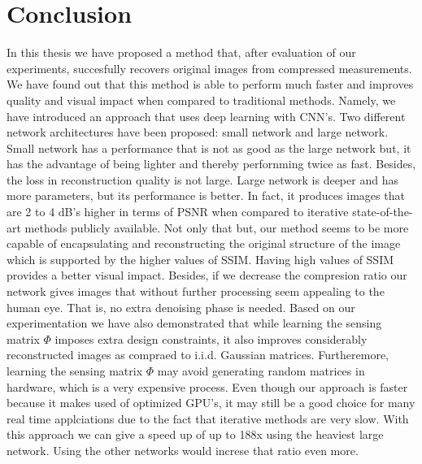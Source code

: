 \chapter{Conclusion}
In this thesis we have proposed a method that, after evaluation of our experiments, succesfully recovers original images from compressed measurements. We have found out that this method is able to perform much faster and improves quality and visual impact when compared to traditional methods. Namely, we have introduced an approach that uses deep learning with CNN's. Two different network architectures have been proposed: small network and large network. Small network has a performance that is not as good as the large network but, it has the advantage of being lighter and thereby perfornming twice as fast. Besides, the loss in reconstruction quality is not large. Large network is deeper and has more parameters, but its performance is better. In fact, it produces images that are 2 to 4 dB's higher in terms of PSNR when compared to iterative state-of-the-art methods publicly available. Not only that but, our method seems to be more capable of encapsulating and reconstructing the original structure of the image which is supported by the higher values of SSIM. Having high values of SSIM provides a better visual impact. Besides, if we decrease the compresion ratio our network gives images that without further processing seem appealing to the human eye. That is, no extra denoising phase is needed. 
\newline \newline 
Based on our experimentation we have also demonstrated that while learning the sensing matrix $\Phi$ imposes extra design constraints, it also improves considerably reconstructed images as compraed to i.i.d. Gaussian matrices. Furtheremore, learning the sensing matrix $\Phi$ may avoid generating random matrices in hardware, which is a very expensive process.
\newline \newline
Even though our approach is faster because it makes used of optimized GPU's, it may still be a good choice for many real time applciations due to the fact that iterative methods are very slow. With this approach we can give a speed up of up to 188x using the heaviest large network. Using the other networks would increse that ratio even more.    


